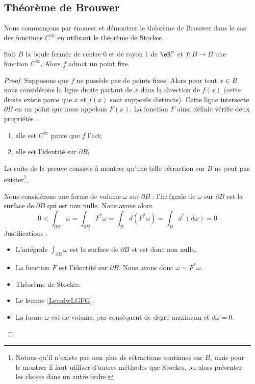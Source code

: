 \subsection{Théorème de Brouwer}

Nous commençons par énoncer et démontrer le théorème de Brouwer dans le cas des fonctions \(  C^{\infty}\) en utilisant le théorème de Stockes.
\begin{proposition}     \label{PropDRpYwv}
    Soit \( B\) la boule fermée de centre \( 0\) et de rayon \( 1\) de \( \eR^n\) et \( f\colon B\to B\) une fonction \(  C^{\infty}\). Alors \( f\) admet un point fixe.
\end{proposition}

\begin{proof}
    Supposons que \( f\) ne possède pas de points fixes. Alors pour tout \( x\in B\) nous considérons la ligne droite partant de \( x\) dans la direction de \( f(x)\) (cette droite existe parce que \( x\) et \( f(x)\) sont supposés distincts). Cette ligne intersecte \( \partial B\) en un point que nous appelons \( F(x)\). La fonction \( F\) ainsi définie vérifie deux propriétés :
    \begin{enumerate}
        \item
            elle est \(  C^{\infty}\) parce que \( f\) l'est;
        \item
            elle est l'identité sur \( \partial B\).
    \end{enumerate}
    La suite de la preuve consiste à montrer qu'une telle rétraction sur \( B\) ne peut pas exister\footnote{Notons qu'il n'existe pas non plus de rétractions continues sur \( B\), mais pour le montrer il faut utiliser d'autres méthodes que Stockes, ou alors présenter les choses dans un autre ordre.}.

    Nous considérons une forme de volume \( \omega\) sur \( \partial B\) : l'intégrale de \( \omega\) sur \( \partial B\) est la surface de \( \partial B\) qui est non nulle. Nous avons alors
    \begin{equation}
        0<\int_{\partial B}\omega
        =\int_{\partial B}F^*\omega
        =\int_Bd(F^*\omega)
        =\int_Bd^*(d\omega)
        =0
    \end{equation}
    Justifications :
    \begin{itemize}
        \item 
            L'intégrale \( \int_{\partial B}\omega\) est la surface de \( \partial B\) et est donc non nulle.
        \item
            La fonction \( F\) est l'identité sur \( \partial B\). Nous avons donc \( \omega=F^*\omega\).
        \item
            Théorème de Stockes.
        \item
            Le lemme \ref{LemdwLGFG}.
        \item
            La forme \( \omega\) est de volume, par conséquent de degré maximum et \( d\omega=0\).
    \end{itemize}
\end{proof}

